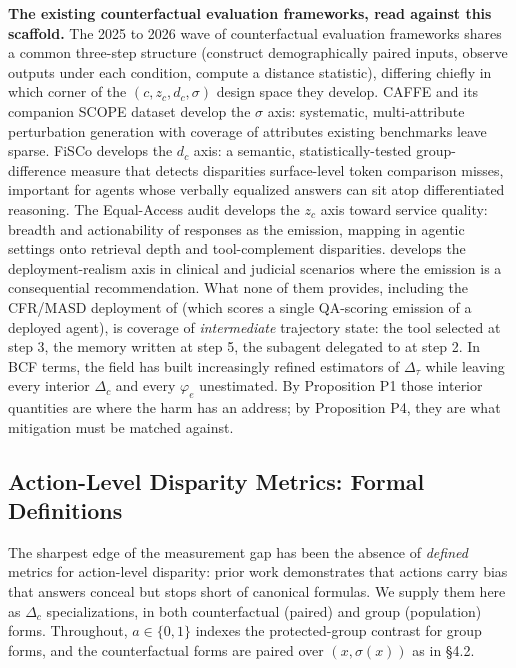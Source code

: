 \documentclass[acmsmall,nonacm]{acmart}
\begin{document}
\textbf{The existing counterfactual evaluation frameworks, read against this scaffold.} The 2025 to 2026 wave of counterfactual evaluation frameworks shares a common three-step structure (construct demographically paired inputs, observe outputs under each condition, compute a distance statistic), differing chiefly in which corner of the $(c, z_c, d_c, \sigma)$ design space they develop. CAFFE \cite{parziale2025systematic} and its companion SCOPE dataset \cite{parziale2026scope} develop the $\sigma$ axis: systematic, multi-attribute perturbation generation with coverage of attributes existing benchmarks leave sparse. FiSCo \cite{xu2025quantifying} develops the $d_c$ axis: a semantic, statistically-tested group-difference measure that detects disparities surface-level token comparison misses, important for agents whose verbally equalized answers can sit atop differentiated reasoning. The Equal-Access audit \cite{amirimargavi2026equal} develops the $z_c$ axis toward service quality: breadth and actionability of responses as the emission, mapping in agentic settings onto retrieval depth and tool-complement disparities. \cite{basu2026names} develops the deployment-realism axis in clinical and judicial scenarios where the emission is a consequential recommendation. What none of them provides, including the CFR/MASD deployment of \cite{mayilvaghanan2026counterfactual} (which scores a single QA-scoring emission of a deployed agent), is coverage of \emph{intermediate} trajectory state: the tool selected at step 3, the memory written at step 5, the subagent delegated to at step 2. In BCF terms, the field has built increasingly refined estimators of $\Delta_\tau$ while leaving every interior $\Delta_c$ and every $\varphi_e$ unestimated. By Proposition P1 those interior quantities are where the harm has an address; by Proposition P4, they are what mitigation must be matched against.

\subsection{Action-Level Disparity Metrics: Formal Definitions}

The sharpest edge of the measurement gap has been the absence of \emph{defined} metrics for action-level disparity: prior work demonstrates that actions carry bias that answers conceal \cite{li2025actions,blankenstein2025biasbusters,xu2026ducx} but stops short of canonical formulas. We supply them here as $\Delta_c$ specializations, in both counterfactual (paired) and group (population) forms. Throughout, $a \in \{0, 1\}$ indexes the protected-group contrast for group forms, and the counterfactual forms are paired over $(x, \sigma(x))$ as in \S{}4.2.
\end{document}
